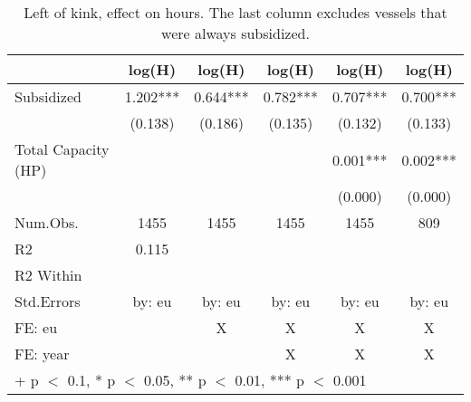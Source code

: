 \begin{table}

\caption{\label{tab:}Left of kink, effect on hours. The last column excludes vessels that were always subsidized.}
\centering
\begin{tabular}[t]{lccccc}
\toprule
  & log(H) & log(H)  & log(H)   & log(H)    & log(H)    \\
\midrule
Subsidized & \num{1.202}*** & \num{0.644}*** & \num{0.782}*** & \num{0.707}*** & \num{0.700}***\\
 & (\num{0.138}) & (\num{0.186}) & (\num{0.135}) & (\num{0.132}) & (\num{0.133})\\
Total Capacity (HP) &  &  &  & \num{0.001}*** & \num{0.002}***\\
 &  &  &  & (\num{0.000}) & (\num{0.000})\\
\midrule
Num.Obs. & \num{1455} & \num{1455} & \num{1455} & \num{1455} & \num{809}\\
R2 & \num{0.115} &  &  &  & \\
R2 Within &  &  &  &  & \\
Std.Errors & by: eu & by: eu & by: eu & by: eu & by: eu\\
FE: eu &  & X & X & X & X\\
FE: year &  &  & X & X & X\\
\bottomrule
\multicolumn{6}{l}{\rule{0pt}{1em}+ p $<$ 0.1, * p $<$ 0.05, ** p $<$ 0.01, *** p $<$ 0.001}\\
\end{tabular}
\end{table}
